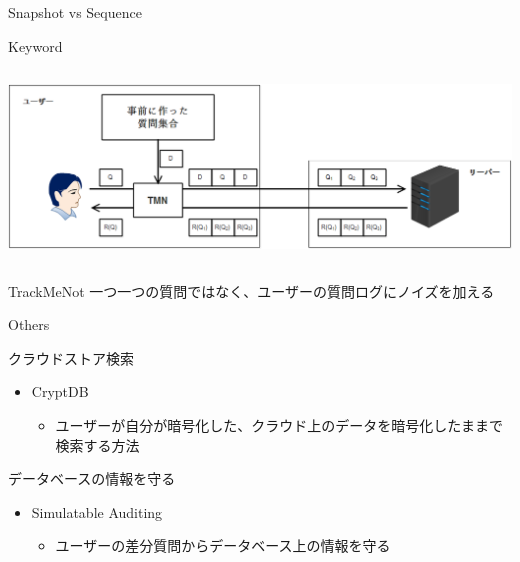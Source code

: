 \documentclass[14pt,xcolor=dvipsnames,table,dvipdfmx]{beamer}
\begin{document}
\begin{frame}{Snapshot vs Sequence}
	\begin{block}{Keyword}
	    \begin{columns}[t]
			\begin{column}{1.0\textwidth} %
				\includegraphics[width=\columnwidth]{photo5.png}
			\end{column}
		\end{columns}
		\begin{block}{TrackMeNot \cite{howe_trackmenot:_2009}}
			一つ一つの質問ではなく、ユーザーの質問ログにノイズを加える
		\end{block}
	\end{block}
\end{frame}

\begin{frame}{Others}
	\begin{exampleblock}{クラウドストア検索}
		\begin{itemize}
			\item CryptDB \cite{popa_cryptdb:_2011}
			\begin{itemize}
				\item ユーザーが自分が暗号化した、クラウド上のデータを暗号化したままで検索する方法
			\end{itemize}
		\end{itemize}
	\end{exampleblock}
   \begin{exampleblock}{データベースの情報を守る}
		\begin{itemize}
			\item Simulatable Auditing \cite{kenthapadi_simulatable_2005}
			\begin{itemize}
				\item ユーザーの差分質問からデータベース上の情報を守る
			\end{itemize}
		\end{itemize}
    \end{exampleblock}

\end{frame}
\end{document}
